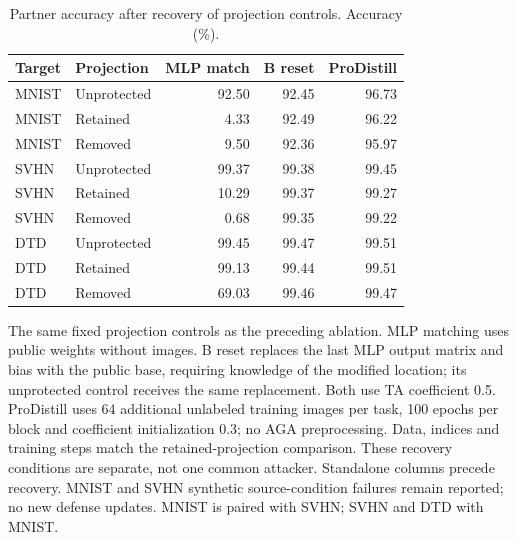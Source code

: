 \begin{table}[t]
\centering\small
\setlength{\tabcolsep}{4pt}
\caption{Partner accuracy after recovery of projection controls. Accuracy (\%).}
\label{tab:defense2_projection_recovery_partners}
\begin{tabular}{@{}llrrr@{}}
\toprule
Target & Projection & MLP match & B reset & ProDistill \\
\midrule
MNIST & Unprotected & 92.50 & 92.45 & 96.73 \\
MNIST & Retained & 4.33 & 92.49 & 96.22 \\
MNIST & Removed & 9.50 & 92.36 & 95.97 \\
\midrule
SVHN & Unprotected & 99.37 & 99.38 & 99.45 \\
SVHN & Retained & 10.29 & 99.37 & 99.27 \\
SVHN & Removed & 0.68 & 99.35 & 99.22 \\
\midrule
DTD & Unprotected & 99.45 & 99.47 & 99.51 \\
DTD & Retained & 99.13 & 99.44 & 99.51 \\
DTD & Removed & 69.03 & 99.46 & 99.47 \\
\bottomrule
\end{tabular}
\par\smallskip
\begin{minipage}{\textwidth}\footnotesize The same fixed projection controls as the preceding ablation. MLP matching uses public weights without images. B reset replaces the last MLP output matrix and bias with the public base, requiring knowledge of the modified location; its unprotected control receives the same replacement. Both use TA coefficient 0.5. ProDistill uses 64 additional unlabeled training images per task, 100 epochs per block and coefficient initialization 0.3; no AGA preprocessing. Data, indices and training steps match the retained-projection comparison. These recovery conditions are separate, not one common attacker. Standalone columns precede recovery. MNIST and SVHN synthetic source-condition failures remain reported; no new defense updates. MNIST is paired with SVHN; SVHN and DTD with MNIST.\end{minipage}
\end{table}
